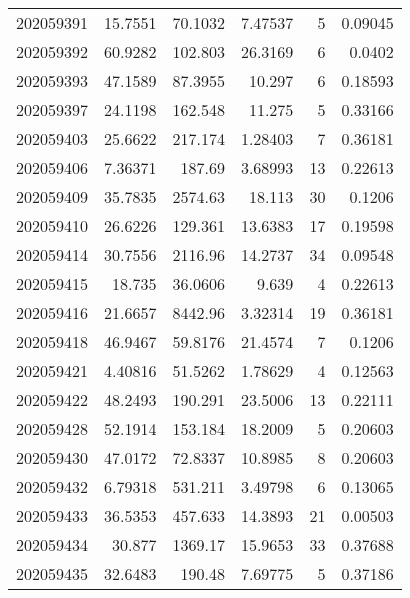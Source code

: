 \begin{tabular}{rrrrrr}
 202059391 &         15.7551  &       70.1032 &            7.47537 &           5 & 0.09045 \\
 202059392 &         60.9282  &      102.803  &           26.3169  &           6 & 0.0402  \\
 202059393 &         47.1589  &       87.3955 &           10.297   &           6 & 0.18593 \\
 202059397 &         24.1198  &      162.548  &           11.275   &           5 & 0.33166 \\
 202059403 &         25.6622  &      217.174  &            1.28403 &           7 & 0.36181 \\
 202059406 &          7.36371 &      187.69   &            3.68993 &          13 & 0.22613 \\
 202059409 &         35.7835  &     2574.63   &           18.113   &          30 & 0.1206  \\
 202059410 &         26.6226  &      129.361  &           13.6383  &          17 & 0.19598 \\
 202059414 &         30.7556  &     2116.96   &           14.2737  &          34 & 0.09548 \\
 202059415 &         18.735   &       36.0606 &            9.639   &           4 & 0.22613 \\
 202059416 &         21.6657  &     8442.96   &            3.32314 &          19 & 0.36181 \\
 202059418 &         46.9467  &       59.8176 &           21.4574  &           7 & 0.1206  \\
 202059421 &          4.40816 &       51.5262 &            1.78629 &           4 & 0.12563 \\
 202059422 &         48.2493  &      190.291  &           23.5006  &          13 & 0.22111 \\
 202059428 &         52.1914  &      153.184  &           18.2009  &           5 & 0.20603 \\
 202059430 &         47.0172  &       72.8337 &           10.8985  &           8 & 0.20603 \\
 202059432 &          6.79318 &      531.211  &            3.49798 &           6 & 0.13065 \\
 202059433 &         36.5353  &      457.633  &           14.3893  &          21 & 0.00503 \\
 202059434 &         30.877   &     1369.17   &           15.9653  &          33 & 0.37688 \\
 202059435 &         32.6483  &      190.48   &            7.69775 &           5 & 0.37186 \\

\end{tabular}
